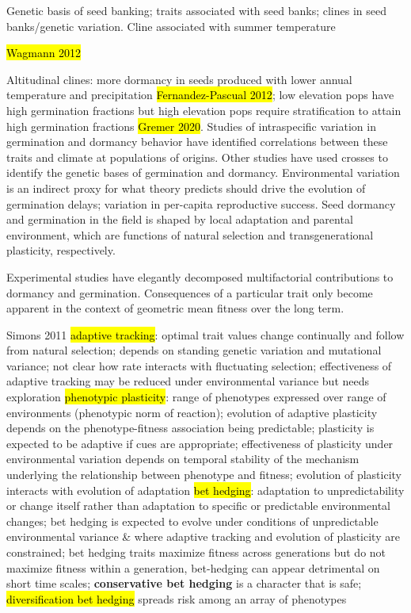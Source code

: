 \documentclass[12pt, oneside, titlepage]{article}   	%
\begin{document}
Genetic basis of seed banking; traits associated with seed banks; clines in seed banks/genetic variation.
Cline associated with summer temperature {\hl{Wagmann 2012}

Altitudinal clines: more dormancy in seeds produced with lower annual temperature and precipitation \hl{Fernandez-Pascual 2012}; low elevation pops have high germination fractions but high elevation pops require stratification to attain high germination fractions \hl{Gremer 2020}. Studies of intraspecific variation in germination and dormancy behavior have identified correlations between these traits and climate at populations of origins. Other studies have used crosses to identify the genetic bases of germination and dormancy. Environmental variation is an indirect proxy for what theory predicts should drive the evolution of germination delays; variation in per-capita reproductive success. Seed dormancy and germination in the field is shaped by local adaptation and parental environment, which are functions of natural selection and transgenerational plasticity, respectively. 

Experimental studies have elegantly decomposed multifactorial contributions to dormancy and germination. Consequences of a particular trait only become apparent in the context of geometric mean fitness over the long term. 

Simons 2011
\hl{adaptive tracking}: optimal trait values change continually and follow from natural selection; depends on standing genetic variation and mutational variance; not clear how rate interacts with fluctuating selection; effectiveness of adaptive tracking may be reduced under environmental variance but needs exploration
\hl{phenotypic plasticity}: range of phenotypes expressed over range of environments (phenotypic norm of reaction); evolution of adaptive plasticity depends on the phenotype-fitness association being predictable; plasticity is expected to be adaptive if cues are appropriate; effectiveness of plasticity under environmental variation depends on temporal stability of the mechanism underlying the relationship between phenotype and fitness; evolution of plasticity interacts with evolution of adaptation
\hl{bet hedging}: adaptation to unpredictability or change itself rather than adaptation to specific or predictable environmental changes; bet hedging is expected to evolve under conditions of unpredictable environmental variance \& where adaptive tracking and evolution of plasticity are constrained; bet hedging traits maximize fitness across generations but do not maximize fitness within a generation, bet-hedging can appear detrimental on short time scales; \textbf{conservative bet hedging} is a character that is safe; \hl{diversification bet hedging} spreads risk among an array of phenotypes

}
\end{document}
